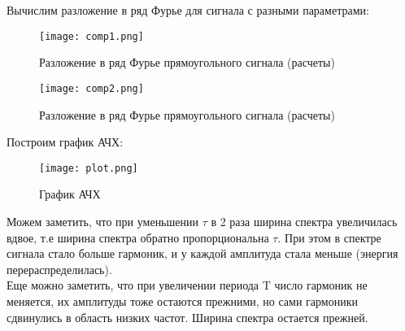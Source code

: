 Вычислим разложение в ряд Фурье для сигнала с разными параметрами:

\begin{figure}[H]
    \centering
    \texttt{[image: comp1.png]}
    \caption{Разложение в ряд Фурье прямоугольного сигнала (расчеты)}
\end{figure}

\begin{figure}[H]
    \centering
    \texttt{[image: comp2.png]}
    \caption{Разложение в ряд Фурье прямоугольного сигнала (расчеты)}
\end{figure}

Построим график АЧХ:

\begin{figure}[H]
    \centering
    \texttt{[image: plot.png]}
    \caption{График АЧХ}
\end{figure}

Можем заметить, что при уменьшении $\tau$ в 2 раза ширина спектра увеличилась вдвое, т.е ширина спектра обратно пропорциональна
$\tau$. При этом в спектре сигнала стало больше гармоник, и у каждой амплитуда стала меньше (энергия перераспределилась). \\

Еще можно заметить, что при увеличении периода T число гармоник не меняется, их амплитуды тоже остаются прежними, но сами 
гармоники сдвинулись в область низких частот. Ширина спектра остается прежней.

\endinput